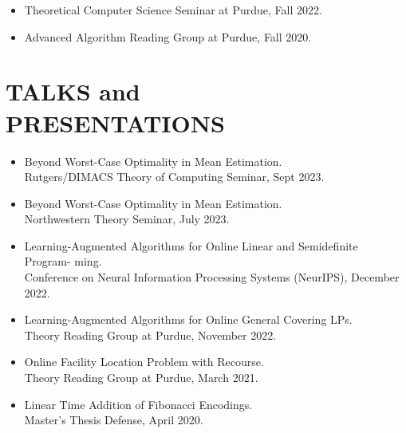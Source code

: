 \documentclass[margin, 10pt]{res} %
\begin{document}
\begin{resume}
\begin{itemize}
\item Theoretical Computer Science Seminar at Purdue, Fall 2022.
\item Advanced Algorithm Reading Group at Purdue, Fall 2020.
\end{itemize}

\section{TALKS and \\ PRESENTATIONS}
\begin{itemize}
\item Beyond Worst-Case Optimality in Mean Estimation.\\
Rutgers/DIMACS Theory of Computing Seminar, Sept 2023.
\item Beyond Worst-Case Optimality in Mean Estimation.\\
Northwestern Theory Seminar, July 2023.
\item Learning-Augmented Algorithms for Online Linear and Semidefinite Program-
ming.\\
Conference on Neural Information Processing Systems (NeurIPS), December 2022.
\item Learning-Augmented Algorithms for Online General Covering LPs.\\
Theory Reading Group at Purdue, November 2022.
\item Online Facility Location Problem with Recourse.\\
Theory Reading Group at Purdue, March 2021.
\item Linear Time Addition of Fibonacci Encodings.\\
Master's Thesis Defense, April 2020.
\end{itemize}


\end{resume}
\end{document}
